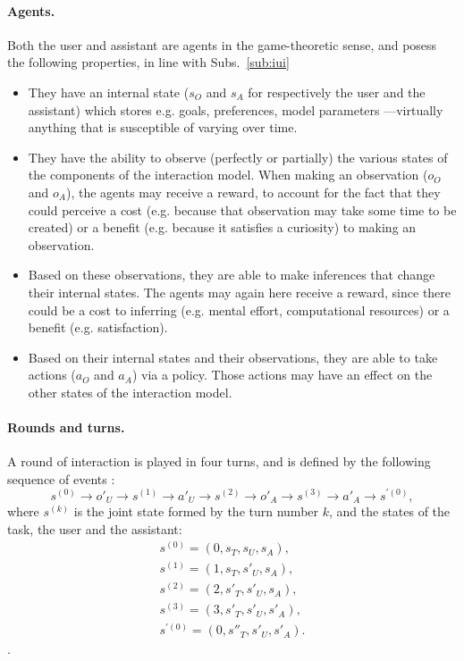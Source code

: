\documentclass[12pt,a4paper]{article}
\begin{document}
\paragraph{Agents.} Both the user and assistant are agents in the game-theoretic sense, and posess the following properties, in line with Subs.~\ref{sub:iui}
\begin{itemize}
\item They have an internal state ($s_O$ and $s_A$ for respectively the user and the assistant) which stores e.g. goals, preferences, model parameters ---virtually anything that is susceptible of varying over time.
\item They have the ability to observe (perfectly or partially) the various states of the components of the interaction model. When making an observation ($o_O$ and $o_A$), the agents may receive a reward, to account for the fact that they could perceive a cost (e.g. because that observation may take some time to be created) or a benefit (e.g. because it satisfies a curiosity) to making an observation.
\item Based on these observations, they are able to make inferences that change their internal states. The agents may again here receive a reward, since there could be a cost to inferring (e.g. mental effort, computational resources) or a benefit (e.g. satisfaction).
\item Based on their internal states and their observations, they are able to take actions ($a_O$ and $a_A$) via a policy. Those actions may have an effect on the other states of the interaction model.
\end{itemize}

\paragraph{Rounds and turns.} A round of interaction is played in four turns, and is defined by the following sequence of events :
$$s^{(0)} \rightarrow o'_U \rightarrow s^{(1)} \rightarrow a'_U \rightarrow s^{(2)} \rightarrow o'_A \rightarrow s^{(3)} \rightarrow a'_A \rightarrow s^{'(0)},$$
where $s^{(k)}$ is the joint state formed by the turn number $k$, and the states of the task, the user and the assistant:
\[\begin{split}s^{(0)} = (0, s_T, s_U, s_A), \\ s^{(1)} = (1, s_T, s'_U, s_A), \\ s^{(2)} = (2, s'_T, s'_U, s_A), \\ s^{(3)} = (3, s'_T, s'_U, s'_A), \\ s^{'(0)} = (0, s''_T, s'_U, s'_A).\end{split}\].
\end{document}
